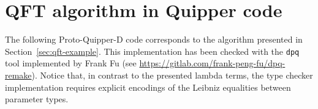 \section{QFT algorithm in Quipper code}%
\label{sec:qft-code}%

The following Proto-Quipper-D code corresponds to the algorithm
presented in Section~\ref{sec:qft-example}.
This implementation has been checked with the \texttt{dpq} tool
implemented by Frank Fu (see \url{https://gitlab.com/frank-peng-fu/dpq-remake}).
Notice that, in contrast to the presented lambda terms,
the type checker implementation
requires explicit encodings of the Leibniz equalities between parameter types.

\inputminted[lastline=39]{haskell}{appendix/SZXEncoding/qft.dpq}